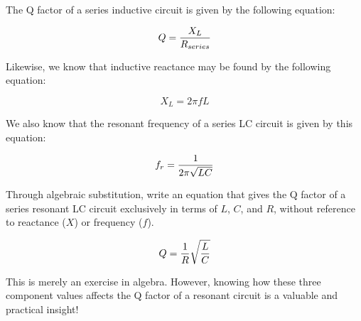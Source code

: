 

The Q factor of a series inductive circuit is given by the following equation:

$$Q = {X_L \over R_{series}}$$

Likewise, we know that inductive reactance may be found by the following equation:

$$X_L = 2 \pi f L$$

We also know that the resonant frequency of a series LC circuit is given by this equation:

$$f_r = {1 \over {2 \pi \sqrt{LC}}}$$

Through algebraic substitution, write an equation that gives the Q factor of a series resonant LC circuit exclusively in terms of $L$, $C$, and $R$, without reference to reactance ($X$) or frequency ($f$).







$$Q = {1 \over R} \sqrt{L \over C}$$







This is merely an exercise in algebra.  However, knowing how these three component values affects the Q factor of a resonant circuit is a valuable and practical insight!




